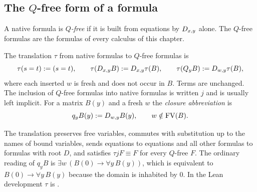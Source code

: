 \subsection{The \texorpdfstring{$Q$}{Q}-free form of a formula}

A native formula is \emph{$Q$-free} if it is built from equations by
$D_{x,y}$ alone. The $Q$-free formulas are the formulas of every calculus
of this chapter.

\begin{definition}
\label{claus:def:tau}
The translation $\tau$ from native formulas to $Q$-free formulas is
\[
 \tau(s=t)\mathrel{:=}(s=t),\qquad
 \tau(D_{x,y}B)\mathrel{:=}D_{x,y}\tau(B),\qquad
 \tau(Q_{y}B)\mathrel{:=}D_{w,y}\tau(B),
\]
where each inserted $w$ is fresh and does not occur in $B$. Terms are
unchanged. The inclusion of $Q$-free formulas into native formulas is
written $j$ and is usually left implicit. For a matrix $B(y)$ and a fresh
$w$ the \emph{closure abbreviation} is
\[
 q_yB(y)\mathrel{:=}D_{w,y}B(y),\qquad w\notin\operatorname{FV}(B).
\]
\end{definition}

The translation preserves free variables, commutes with substitution up to
the names of bound variables, sends equations to equations and all other
formulas to formulas with root $D$, and satisfies $\tau jF\equiv F$ for
every $Q$-free $F$. The ordinary reading of $q_yB$ is
$\exists w\,(B(0)\to\forall y\,B(y))$, which is equivalent to
$B(0)\to\forall y\,B(y)$ because the domain is inhabited by $0$. In the Lean
development $\tau$ is .

